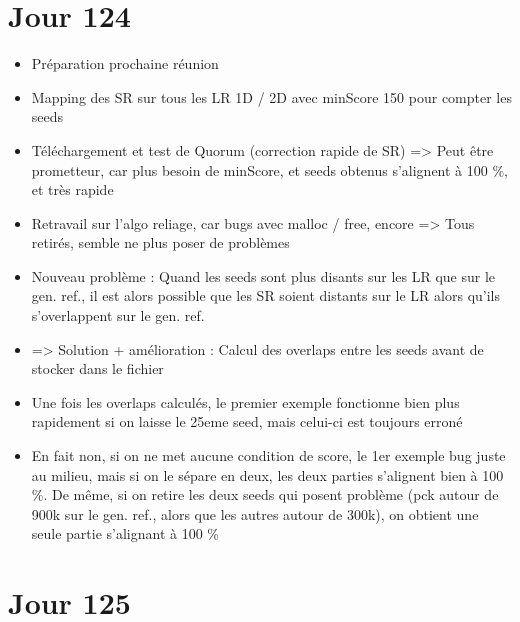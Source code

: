\documentclass[12pt]{report}
\begin{document}
\section{Jour 124}

\begin{itemize}
	\item Préparation prochaine réunion
	
	\item Mapping des SR sur tous les LR 1D / 2D avec minScore 150 pour compter les seeds
	
	\item Téléchargement et test de Quorum (correction rapide de SR) => Peut être prometteur, car plus besoin de minScore, et seeds
		  obtenus s'alignent à 100 \%, et très rapide
		  
	\item Retravail sur l'algo reliage, car bugs avec malloc / free, encore => Tous retirés, semble ne plus poser de problèmes
	
	\item Nouveau problème : Quand les seeds sont plus disants sur les LR que sur le gen. ref., il est alors possible que les SR soient
		  distants sur le LR alors qu'ils s'overlappent sur le gen. ref.
	
	\item => Solution + amélioration : Calcul des overlaps entre les seeds avant de stocker dans le fichier
	
	\item Une fois les overlaps calculés, le premier exemple fonctionne bien plus rapidement si on laisse le 25eme seed,
		  mais celui-ci est toujours erroné
		  
	\item En fait non, si on ne met aucune condition de score, le 1er exemple bug juste au milieu, mais si on le sépare en deux, les deux parties
		  s'alignent bien à 100 \%.
		  De même, si on retire les deux seeds qui posent problème (pck autour de 900k sur le gen. ref., alors que les autres autour de 300k),
		  on obtient une seule partie s'alignant à 100 \%
\end{itemize}

\section{Jour 125}
\end{document}
